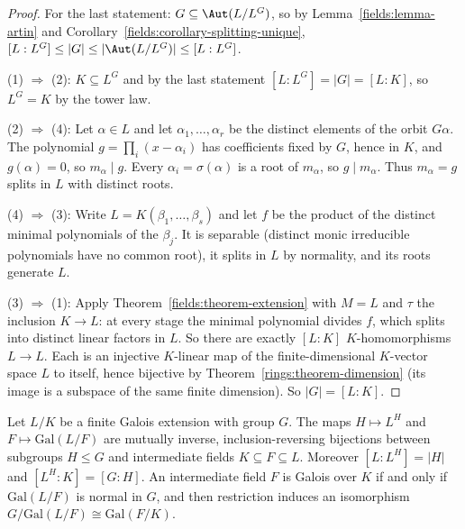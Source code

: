 \begin{proof}
For the last statement: $G \subseteq \Aut(L/L^G)$, so by Lemma~\ref{fields:lemma-artin} and
Corollary~\ref{fields:corollary-splitting-unique},
$[L : L^G] \leq |G| \leq |\Aut(L/L^G)| \leq [L : L^G]$.

(1) $\Rightarrow$ (2): $K \subseteq L^G$ and by the last statement $[L : L^G] = |G| = [L : K]$, so
$L^G = K$ by the tower law.

(2) $\Rightarrow$ (4): Let $\alpha \in L$ and let $\alpha_1, \ldots, \alpha_r$ be the distinct elements of the
orbit $G\alpha$. The polynomial $g = \prod_i (x - \alpha_i)$ has coefficients fixed by $G$, hence in
$K$, and $g(\alpha) = 0$, so $m_\alpha \mid g$. Every $\alpha_i = \sigma(\alpha)$ is a root of $m_\alpha$, so $g \mid m_\alpha$.
Thus $m_\alpha = g$ splits in $L$ with distinct roots.

(4) $\Rightarrow$ (3): Write $L = K(\beta_1, \ldots, \beta_s)$ and let $f$ be the product of the distinct
minimal polynomials of the $\beta_j$. It is separable (distinct monic irreducible
polynomials have no common root), it splits in $L$ by normality, and its roots
generate $L$.

(3) $\Rightarrow$ (1): Apply Theorem~\ref{fields:theorem-extension} with $M = L$ and $\tau$ the
inclusion $K \to L$: at every stage the minimal polynomial divides $f$, which splits into
distinct linear factors in $L$. So there are exactly $[L : K]$ $K$-homomorphisms $L \to L$.
Each is an injective $K$-linear map of the finite-dimensional $K$-vector space $L$ to itself,
hence bijective by Theorem~\ref{rings:theorem-dimension} (its image is a subspace of the
same finite dimension). So $|G| = [L : K]$.
\end{proof}

\begin{theorem}\label{fields:theorem-fundamental}
Let $L/K$ be a finite Galois extension with group $G$. The maps $H \mapsto L^H$ and
$F \mapsto \mathrm{Gal}(L/F)$ are mutually inverse, inclusion-reversing bijections between
subgroups $H \leq G$ and intermediate fields $K \subseteq F \subseteq L$. Moreover
$[L : L^H] = |H|$ and $[L^H : K] = [G : H]$. An intermediate field $F$ is Galois over $K$ if
and only if $\mathrm{Gal}(L/F)$ is normal in $G$, and then restriction induces an isomorphism
$G/\mathrm{Gal}(L/F) \cong \mathrm{Gal}(F/K)$.
\end{theorem}

